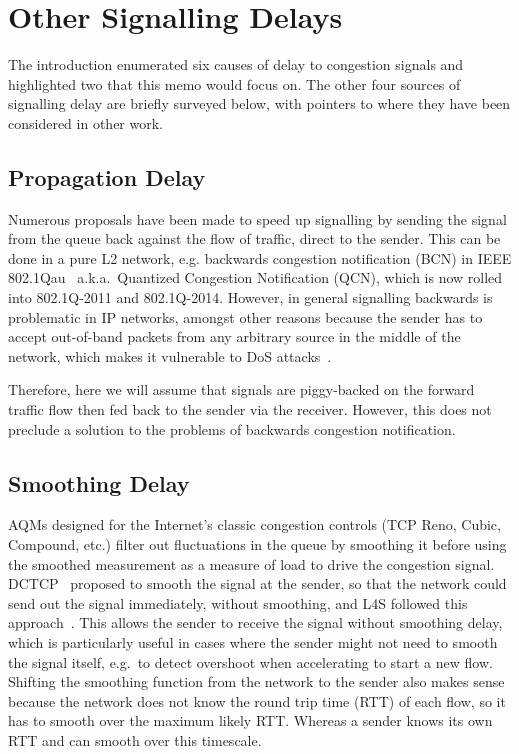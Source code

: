 \section{Other Signalling Delays}\label{sec:other_delays}

The introduction enumerated six causes of delay to congestion signals and highlighted two that this memo would focus on. The other four sources of signalling delay are briefly surveyed below, with pointers to where they have been considered in other work.

\subsection{Propagation Delay} Numerous proposals have been made to speed up signalling by sending the signal from the queue back against the flow of traffic, direct to the sender. This can be done in a pure L2 network, e.g. backwards congestion notification (BCN) in IEEE 802.1Qau~\cite{IEEE802.1Qau:Ethernet_QCN} a.k.a.\ Quantized Congestion Notification (QCN), which is now rolled into 802.1Q-2011 and 802.1Q-2014. However, in general signalling backwards is problematic in IP networks, amongst other reasons because the sender has to accept out-of-band packets from any arbitrary source in the middle of the network, which makes it vulnerable to DoS attacks~\cite{IETF_RFC6633:ICMP_SQ_Depr}. 

Therefore, here we will assume that signals are piggy-backed on the forward traffic flow then fed back to the sender via the receiver. However, this does not preclude a solution to the problems of backwards congestion notification.

\subsection{Smoothing Delay} AQMs designed for the Internet's classic congestion controls (TCP Reno, Cubic, Compound, etc.) filter out fluctuations in the queue by smoothing it before using the smoothed measurement as a measure of load to drive the congestion signal. DCTCP~\cite{Alizadeh10:DCTCP} proposed to smooth the signal at the sender, so that the network could send out the signal immediately, without smoothing, and L4S followed this approach~\cite{Briscoe16a:l4s-arch_ID}. This allows the sender to receive the signal without smoothing delay, which is particularly useful in cases where the sender might not need to smooth the signal itself, e.g.\ to detect overshoot when accelerating to start a new flow. Shifting the smoothing function from the network to the sender also makes sense because the network does not know the round trip time (RTT) of each flow, so it has to smooth over the maximum likely RTT. Whereas a sender knows its own RTT and can smooth over this timescale.

